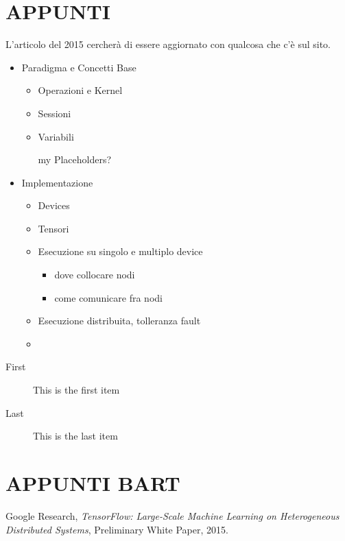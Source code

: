 \documentclass[DIV=calc, paper=a4, fontsize=11pt]{scrartcl}	 %
\begin{document}
\begin{multicols}{2}
		\section{APPUNTI}
		L'articolo del 2015 cercherà di essere aggiornato con qualcosa che c'è sul sito.
			\begin{itemize}
				\item Paradigma e Concetti Base
				\begin{itemize}
					\item Operazioni e Kernel
					\item Sessioni
					\item Variabili
					\item[my] Placeholders?
				\end{itemize}
				\item Implementazione
				\begin{itemize}
					\item Devices
					\item Tensori
					\item Esecuzione su singolo e multiplo device
					\begin{itemize}
						\item dove collocare nodi
						\item come comunicare fra nodi
					\end{itemize}
					\item Esecuzione distribuita, tolleranza fault
				\end{itemize}
				
				
				\begin{itemize}
					\item
				\end{itemize}
			\end{itemize}
		
		\begin{description}
		\item[First] This is the first item
		\item[Last] This is the last item
		\end{description}
		
		\section{APPUNTI BART}
		
		\begin{thebibliography}{9}
			Google Research,
			\emph{TensorFlow: Large-Scale Machine Learning on Heterogeneous Distributed Systems},
			Preliminary White Paper,
			2015.
		\end{thebibliography}
	\end{multicols}
\end{document}
